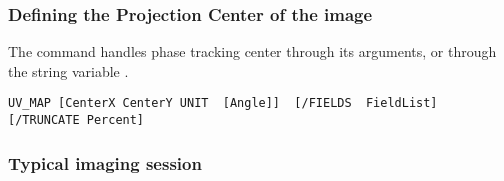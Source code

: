 % 
% 
% 
% 

\subsubsection{Defining the Projection Center of the image}
\label{sub:single:center}

The command  handles phase tracking center through its arguments, 
or through the string variable .

\begin{verbatim}
UV_MAP [CenterX CenterY UNIT  [Angle]]  [/FIELDS  FieldList]  [/TRUNCATE Percent]
\end{verbatim}
    
%

\subsubsection{Typical imaging session}
\label{sub:single:example}

